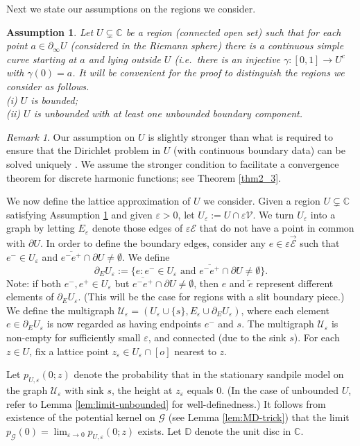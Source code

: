 \documentclass[11pt]{article}
\newtheorem{assumption}{Assumption}[section]
\theoremstyle{remark}
\newtheorem{remark}{Remark}
\def\eps{\varepsilon}
\def\C{\mathbb{C}}
\def\D{\mathbb{D}}
\def\cG{\mathcal{G}}
\def\cU{\mathcal{U}}
\def\cV{\mathcal{V}}
\def\cE{\mathcal{E}}
\begin{document}
Next we state our assumptions on the regions we consider. 
\begin{assumption}
\label{a:U} 
Let $U \subsetneq \mathbb{C}$ be a region (connected open set) such that for each point
$a \in \partial_\infty U$ (considered in the Riemann sphere) there is a continuous simple
curve starting at $a$ and lying outside $U$ (i.e.~there is an injective 
$\gamma: [0,1] \to U^c$ with $\gamma(0) = a$.
It will be convenient for the proof to distinguish the regions we consider as follows. \ \\
(i) $U$ is bounded; \\
(ii) $U$ is unbounded with at least one unbounded boundary component.
\end{assumption}

\begin{remark}
\label{rem:bdry-U}
Our assumption on $U$ is slightly stronger than what is required to ensure that the 
Dirichlet problem in $U$ (with continuous boundary data) can be solved 
uniquely \cite[Corollary 10.4.17]{Conway-book-I}. We assume the stronger condition 
to facilitate a convergence theorem for discrete harmonic functions; 
see Theorem \ref{thm2_3}.
\end{remark}


We now define the lattice approximation of $U$ we consider.
Given a region $U \subsetneq \C$ satisfying Assumption \ref{a:U} and given $\eps > 0$, 
let $U_\eps := U \cap \eps \cV$. We turn 
$U_\eps$ into a graph by letting $E_\eps$ denote those edges of $\eps \cE$ that do not
have a point in common with $\partial U$. In order to define the boundary edges, consider
any $e \in \eps \vec{\cE}$ such that $e^- \in U_\eps$ and 
$\overline{e^- e^+} \cap \partial U \not= \emptyset$. We define 
\[ \partial_E U_\eps
   := \{ e : \text{$e^- \in U_\eps$ and 
      $\overline{e^- e^+} \cap \partial U \not= \emptyset$} \}. \]
Note: if both $e^-, e^+ \in U_\eps$ but $\overline{e^- e^+} \cap \partial U \not= \emptyset$,
then $e$ and $\overleftarrow{e}$ represent different elements of $\partial_E U_\eps$. (This 
will be the case for regions with a slit boundary piece.) We define the multigraph 
$\cU_\eps = (U_\eps \cup \{ s \}, E_\eps \cup \partial_E U_\eps)$, where each element
$e \in \partial_E U_\eps$ is now regarded as having endpoints $e^-$ and $s$.
The multigraph $\cU_\eps$ is non-empty for sufficiently small $\eps$, 
and connected (due to the sink $s$). 
For each $z \in U$, fix a lattice point $z_\eps \in U_\eps \cap [o]$ nearest to $z$.

Let $p_{U,\eps}(0;z)$ denote the probability that in the stationary sandpile model 
on the graph $\cU_\eps$ with sink $s$, the height at $z_\eps$ equals $0$. (In the case 
of unbounded $U$, refer to Lemma \ref{lem:limit-unbounded} for well-definedness.) 
It follows from existence of the potential kernel on $\cG$ (see Lemma \ref{lem:MD-trick})  
that the limit $p_\cG(0) = \lim_{\eps \to 0} p_{U,\eps}(0;z)$ exists. 
Let $\D$ denote the unit disc in $\C$.
\end{document}
